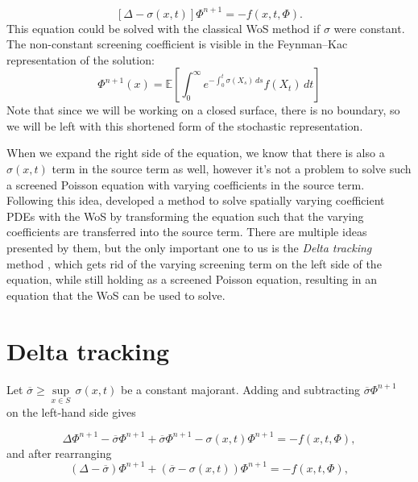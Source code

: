 \documentclass[
]{elteiktdk}[2024/04/26]
\begin{document}
	\begin{equation}
		\label{cMFCPossion}
		\left[\Delta - \sigma(x,t)\right]\Phi^{n+1} = -f(x,t,\Phi).
	\end{equation} 
	This equation could be solved with the classical WoS method if $\sigma$ were constant. The non-constant screening coefficient is visible in the Feynman--Kac representation of the solution:
	\begin{equation}
		\Phi^{n+1}(x) = \mathbb{E}\left[\int_{0}^{\infty} e^{-\int_{0}^{t} \sigma(X_s) \, ds} f(X_t) \, dt\right]
	\end{equation}
	Note that since we will be working on a closed surface, there is no boundary, so we will be left with this shortened form of the stochastic representation.
	 
	When we expand the right side of the equation, we know that there is also a $\sigma(x,t)$ term in the source term as well, however it's not a problem to solve such a screened Poisson equation with varying coefficients in the source term. Following this idea, \textcite{sawhneyseyb22gridfree} developed a method to solve spatially varying coefficient PDEs with the WoS by transforming the equation such that the varying coefficients are transferred into the source term. There are multiple ideas presented by them, but the only important one to us is the \textit{Delta tracking} method \cite{raab2008unbiased}, which gets rid of the varying screening term on the left side of the equation, while still holding as a screened Poisson equation, resulting in an equation that the WoS can be used to solve.
	
	\section{Delta tracking}
	
	Let $\overline{\sigma} \geq \underset{x \in S}{\sup}\, \sigma(x,t)$ be a constant majorant. Adding and subtracting $\overline{\sigma} \Phi^{n+1}$ on the left-hand side gives
	
	\begin{equation}
		\Delta \Phi^{n+1} - \overline{\sigma}\Phi^{n+1} + \overline{\sigma}\Phi^{n+1} - \sigma(x,t)\Phi^{n+1} = -f(x,t,\Phi),
	\end{equation}
	and after rearranging
	\begin{equation}
		\left(\Delta - \overline{\sigma}\right)\Phi^{n+1} + \left(\overline{\sigma} - \sigma(x,t)\right)\Phi^{n+1} = -f(x,t,\Phi),
	\end{equation}
	
\end{document}
